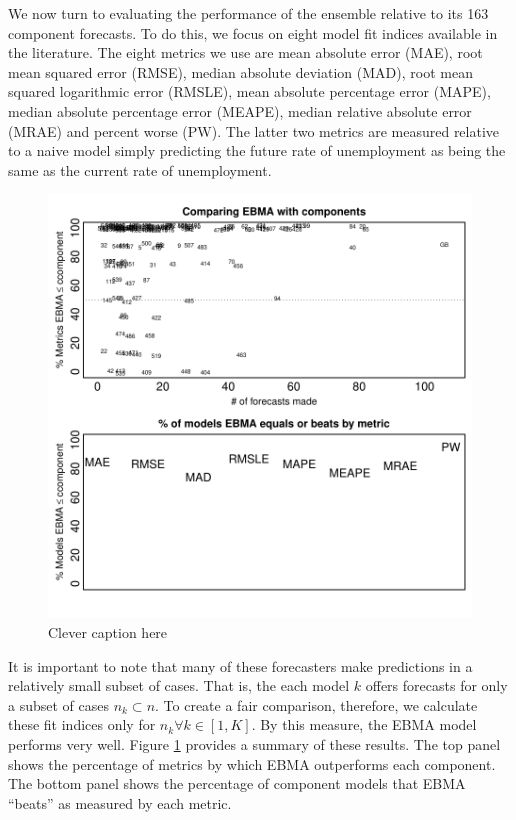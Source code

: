 \documentclass[12pt,fullpage,endnotes]{article}
\begin{document}
We now turn to evaluating the performance of the ensemble relative to
its 163 component forecasts.  To do this, we focus on eight model fit
indices available in the literature.  The eight metrics we use are
mean absolute error (MAE), root mean squared error (RMSE), median
absolute deviation (MAD), root mean squared logarithmic error (RMSLE),
mean absolute percentage error (MAPE), median absolute percentage
error (MEAPE), median relative absolute error (MRAE) and percent worse
(PW).  The latter two metrics are measured relative to a naive model
simply predicting the future rate of unemployment as being the same as
the current rate of unemployment.


\begin{figure}[h]
\caption{Clever caption here}
\label{compare2Components}
\begin{center}
\includegraphics{compare2Components}
\end{center}
\end{figure}

It is important to note that many of these forecasters make
predictions in a relatively small subset of cases.  That is, the each
model $k$ offers forecasts for only a subset of cases $n_k \subset n$.
To create a fair comparison, therefore, we calculate these fit indices
only for $n_k \forall k \in [1,K]$.  By this measure, the EBMA model
performs very well.  Figure \ref{compare2Components} provides a
summary of these results.  The top panel shows the percentage of
metrics by which EBMA outperforms each component. The bottom panel
shows the percentage of component models that EBMA ``beats'' as
measured by each metric.
\end{document}
